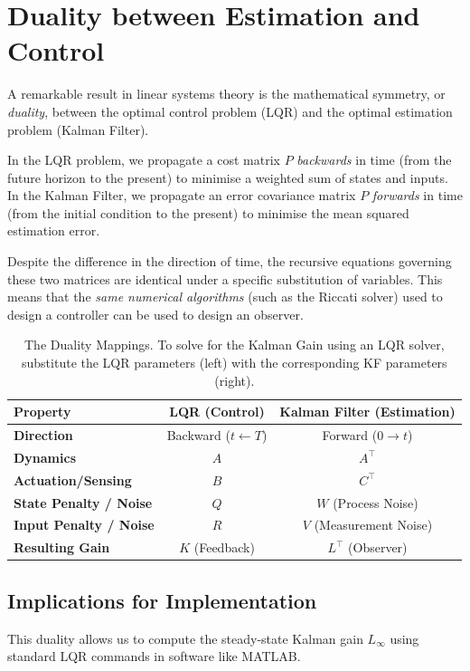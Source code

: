 \section{Duality between Estimation and Control}

A remarkable result in linear systems theory is the mathematical symmetry, or \emph{duality}, between the optimal control problem (LQR) and the optimal estimation problem (Kalman Filter).

In the LQR problem, we propagate a cost matrix $P$ \textit{backwards} in time (from the future horizon to the present) to minimise a weighted sum of states and inputs. In the Kalman Filter, we propagate an error covariance matrix $P$ \textit{forwards} in time (from the initial condition to the present) to minimise the mean squared estimation error.

Despite the difference in the direction of time, the recursive equations governing these two matrices are identical under a specific substitution of variables. This means that the \emph{same numerical algorithms} (such as the Riccati solver) used to design a controller can be used to design an observer.

\begin{table}[h]
	\centering
	\caption{The Duality Mappings. To solve for the Kalman Gain using an LQR solver, substitute the LQR parameters (left) with the corresponding KF parameters (right).}
	\label{tab:duality}
	\renewcommand{\arraystretch}{1.3} %
	\begin{tabular}{lcc}
		\toprule
		\textbf{Property} & \textbf{LQR (Control)} & \textbf{Kalman Filter (Estimation)} \\
		\midrule
		\textbf{Direction} & Backward ($t \leftarrow T$) & Forward ($0 \to t$) \\
		\textbf{Dynamics} & $A$ & $A^\top$ \\
		\textbf{Actuation/Sensing} & $B$ & $C^\top$ \\
		\textbf{State Penalty / Noise} & $Q$ & $W$ (Process Noise) \\
		\textbf{Input Penalty / Noise} & $R$ & $V$ (Measurement Noise) \\
		\textbf{Resulting Gain} & $K$ (Feedback) & $L^\top$ (Observer) \\
		\bottomrule
	\end{tabular}
\end{table}

\subsection{Implications for Implementation}
This duality allows us to compute the steady-state Kalman gain $L_{\infty}$ using standard LQR commands in software like MATLAB. 

